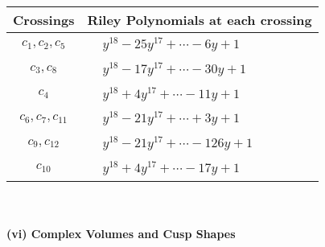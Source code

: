 \documentclass[1p]{elsarticle_modified}
\theoremstyle{definition}
\begin{document}
\begin{tabular}{m{50pt}|m{274pt}}
Crossings & \hspace{64pt}Riley Polynomials at each crossing \\
\hline $$\begin{aligned}c_{1},c_{2},c_{5}\end{aligned}$$&$\begin{aligned}
&y^{18}-25 y^{17}+\cdots-6 y+1
\end{aligned}$\\
\hline $$\begin{aligned}c_{3},c_{8}\end{aligned}$$&$\begin{aligned}
&y^{18}-17 y^{17}+\cdots-30 y+1
\end{aligned}$\\
\hline $$\begin{aligned}c_{4}\end{aligned}$$&$\begin{aligned}
&y^{18}+4 y^{17}+\cdots-11 y+1
\end{aligned}$\\
\hline $$\begin{aligned}c_{6},c_{7},c_{11}\end{aligned}$$&$\begin{aligned}
&y^{18}-21 y^{17}+\cdots+3 y+1
\end{aligned}$\\
\hline $$\begin{aligned}c_{9},c_{12}\end{aligned}$$&$\begin{aligned}
&y^{18}-21 y^{17}+\cdots-126 y+1
\end{aligned}$\\
\hline $$\begin{aligned}c_{10}\end{aligned}$$&$\begin{aligned}
&y^{18}+4 y^{17}+\cdots-17 y+1
\end{aligned}$\\
\hline
\end{tabular}\\~\\
\newpage\flushleft \textbf{(vi) Complex Volumes and Cusp Shapes}
\end{document}
